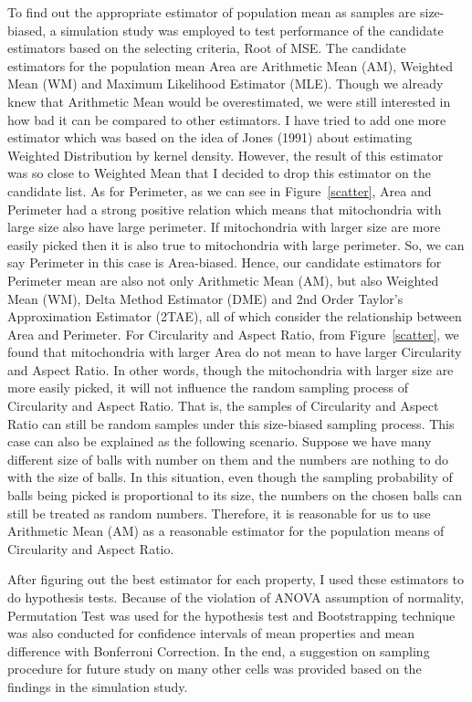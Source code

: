 \documentclass{article}\usepackage[]{graphicx}\usepackage[]{color}
\numberwithin{figure}{subsection} %
\numberwithin{table}{subsection} %
\begin{document}
To find out the appropriate estimator of population mean as samples are size-biased, a simulation study was employed to test performance of the candidate estimators based on the selecting criteria, Root of MSE. The candidate estimators for the population mean Area are Arithmetic Mean (AM), Weighted Mean (WM) and Maximum Likelihood Estimator (MLE). Though we already knew that Arithmetic Mean would be overestimated, we were still interested in how bad it can be compared to other estimators. I have tried to add one more estimator which was based on the idea of Jones (1991) about estimating Weighted Distribution by kernel density. However, the result of this estimator was so close to Weighted Mean that I decided to drop this estimator on the candidate list. As for Perimeter, as we can see in Figure~\ref{scatter}, Area and Perimeter had a strong positive relation which means that mitochondria with large size also have large perimeter. If mitochondria with larger size are more easily picked then it is also true to mitochondria with large perimeter. So, we can say Perimeter in this case is Area-biased. Hence, our candidate estimators for Perimeter mean are also not only Arithmetic Mean (AM), but also Weighted Mean (WM), Delta Method Estimator (DME) and 2nd Order Taylor's Approximation Estimator (2TAE), all of which consider the relationship between Area and Perimeter. For Circularity and Aspect Ratio, from Figure~\ref{scatter}, we found that mitochondria with larger Area do not mean to have larger Circularity and Aspect Ratio. In other words, though the mitochondria with larger size are more easily picked, it will not influence the random sampling process of Circularity and Aspect Ratio. That is, the samples of Circularity and Aspect Ratio can still be random samples under this size-biased sampling process. This case can also be explained as the following scenario. Suppose we have many different size of balls with number on them and the numbers are nothing to do with the size of balls. In this situation, even though the sampling probability of balls being picked is proportional to its size, the numbers on the chosen balls can still be treated as random numbers. Therefore, it is reasonable for us to use Arithmetic Mean (AM) as a reasonable estimator for the population means of Circularity and Aspect Ratio. 

After figuring out the best estimator for each property, I used these estimators to do hypothesis tests. Because of the violation of ANOVA assumption of normality, Permutation Test was used for the hypothesis test and Bootstrapping technique was also conducted for confidence intervals of mean properties and mean difference with Bonferroni Correction. In the end, a suggestion on sampling procedure for future study on many other cells was provided based on the findings in the simulation study. 
\end{document}
